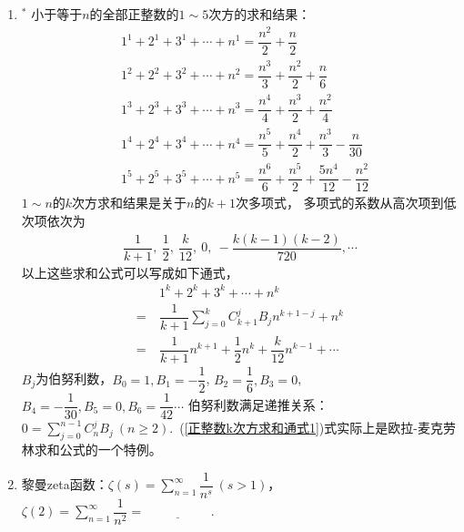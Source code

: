 \documentclass{article}
\newif\ifte
\renewcommand\geq\geqslant
\begin{document}
\begin{multicols}{2}
\begin{enumerate}[leftmargin=20pt]
\item $^*$ \label{正整数k次方求和}小于等于$ n $的全部正整数的$ 1\sim 5 $次方的求和结果：
\begin{align*}
    & 1^1+2^1+3^1+\cdots +n^1=\dfrac{n^2}{2}+\dfrac{n}{2}\\
    & 1^2+2^2+3^2+\cdots +n^2=\dfrac{n^3}{3}+
        \dfrac{n^2}{2}+\dfrac{n}{6}\\
    & 1^3+2^3+3^3+\cdots +n^3=\dfrac{n^4}{4}+
        \dfrac{n^3}{2}+\dfrac{n^2}{4} \\
    & 1^4+2^4+3^4+\cdots +n^4=\dfrac{n^5}{5}+\dfrac{n^4}{2}
        +\dfrac{n^3}{3}-\dfrac{n}{30} \\
    & 1^5+2^5+3^5+\cdots +n^5=\dfrac{n^6}{6}+\dfrac{n^5}{2}
        +\dfrac{5n^4}{12}-\dfrac{n^2}{12} 
\end{align*}
$ 1\sim n $的$ k $次方求和结果是关于$ n $的$ k+1 $次多项式，
多项式的系数从高次项到低次项依次为
\begin{gather*}
    \dfrac{1}{k+1},\ \dfrac{1}{2},\ \dfrac{k}{12},\ 0,
    \ -\dfrac{k(k-1)(k-2)}{720},\cdots
\end{gather*}
以上这些求和公式可以写成如下通式，
\begin{align}
    &\ 1^k+2^k+3^k+\cdots +n^k \nonumber \\=&\ \dfrac{1}{k+1}
    \sum_{j=0}^{k}C_{k+1}^{j}B_{j}n^{k+1-j}+n^{k}
    \label{正整数k次方求和通式1} \\
    =&\ \dfrac{1}{k+1}n^{k+1}+\dfrac{1}{2}n^k+\dfrac{k}{12}n^{k-1}+\cdots
    \label{正整数k次方求和通式2}
\end{align}
$ B_j $为伯努利数，$ B_0=1,B_1=-\dfrac{1}{2} $,
$ B_2=\dfrac{1}{6},B_3=0 $,$ B_4=-\dfrac{1}{30},B_5=0,B_6=\dfrac{1}{42}\cdots$
伯努利数满足递推关系：$ 0=\sum\limits_{j=0}^{n-1}C_n^jB_j\ (n\geq 2) $.\ 
(\ref{正整数k次方求和通式1})式实际上是欧拉-麦克劳林求和公式的一个特例。

\item 黎曼zeta函数：$ \zeta(s)=\sum\limits_{n=1}^{\infty} 
\dfrac{1}{n^s}\ (s>1) $，\\ $ \zeta(2)=\sum\limits_{n=1}^{\infty}
\dfrac{1}{n^2}=\underline{\ \ifte \dfrac{\pi^2}{6}
\else \hspace{2cm} \fi\ } $. 
 

\end{enumerate}
\end{multicols}
\end{document}
